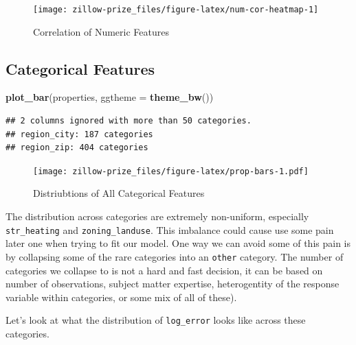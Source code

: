 \documentclass[]{book}
\newenvironment{Shaded}{\begin{snugshade}}{\end{snugshade}}
\newcommand{\KeywordTok}[1]{\textcolor[rgb]{0.13,0.29,0.53}{\textbf{#1}}}
\newcommand{\DataTypeTok}[1]{\textcolor[rgb]{0.13,0.29,0.53}{#1}}
\newcommand{\NormalTok}[1]{#1}
\theoremstyle{definition}
\theoremstyle{definition}
\theoremstyle{definition}
\theoremstyle{remark}
\begin{document}
\begin{figure}
\texttt{[image: zillow-prize\_files/figure-latex/num-cor-heatmap-1]} \caption{Correlation of Numeric Features}\label{fig:num-cor-heatmap}
\end{figure}

\subsection{Categorical Features}\label{categorical-features}

\begin{Shaded}
\begin{Highlighting}[]
\KeywordTok{plot_bar}\NormalTok{(properties, }\DataTypeTok{ggtheme =} \KeywordTok{theme_bw}\NormalTok{())}
\end{Highlighting}
\end{Shaded}

\begin{verbatim}
## 2 columns ignored with more than 50 categories.
## region_city: 187 categories
## region_zip: 404 categories
\end{verbatim}

\begin{figure}
\centering
\texttt{[image: zillow-prize\_files/figure-latex/prop-bars-1.pdf]}
\caption{\label{fig:prop-bars}Distriubtions of All Categorical Features}
\end{figure}

The distribution across categories are extremely non-uniform, especially
\texttt{str\_heating} and \texttt{zoning\_landuse}. This imbalance could
cause use some pain later one when trying to fit our model. One way we
can avoid some of this pain is by collapsing some of the rare categories
into an \texttt{other} category. The number of categories we collapse to
is not a hard and fast decision, it can be based on number of
observations, subject matter expertise, heterogentity of the response
variable within categories, or some mix of all of these).

Let's look at what the distribution of \texttt{log\_error} looks like
across these categories.
\end{document}
